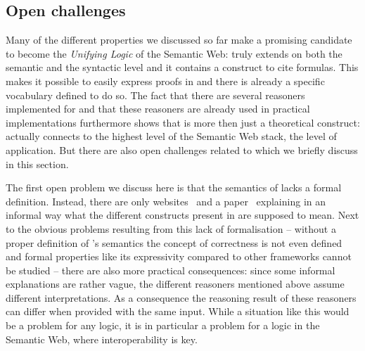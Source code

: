 





\subsection{Open challenges}
Many of the different properties we discussed so far make \nthree a promising candidate to become the \emph{Unifying Logic} of the Semantic Web: \nthree truly extends \rdf on both the semantic and the syntactic 
level and it contains a construct to cite formulas. This makes it possible to easily express  proofs in \nthree and there is already a specific vocabulary defined to do so.
The fact that there are several reasoners implemented for \nthree and that these reasoners are already used in practical implementations furthermore shows that \nthreelogic is more then just a theoretical construct: 
\nthree actually connects to the highest level of the Semantic Web stack, 
the level of application. But there are also open challenges related to \nthree which we briefly discuss in this section.

The first open problem we discuss here is that the semantics of \nthree lacks a formal definition. Instead, there are only websites~\cite{Notation3,Notation32} and a paper~\cite{N3Logic} explaining in 
an informal way what the different constructs present in \nthree are supposed to mean. Next to the obvious problems resulting from this lack of formalisation -- without a proper definition of \nthree's semantics 
the concept of correctness is not even defined and formal properties like its expressivity compared to other frameworks %
cannot 
be studied -- there are also more practical consequences: since some informal explanations are rather vague, the different reasoners mentioned above assume different interpretations.  
As a consequence the reasoning result of these reasoners can differ when provided with the same input. While a situation like this would be a problem for any logic, 
it is in particular a problem for a logic in the Semantic Web, where interoperability is key. 

